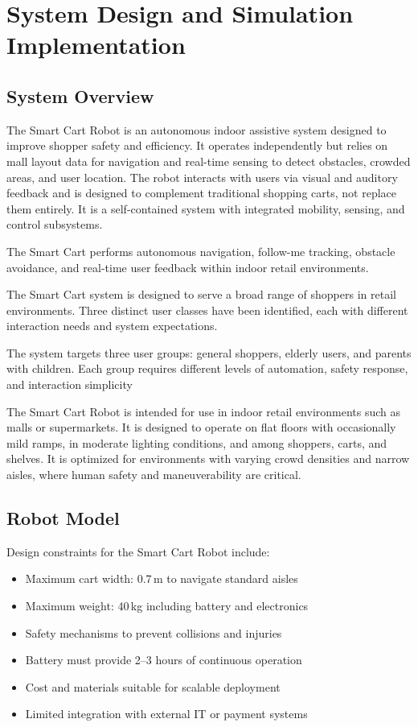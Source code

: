 \section{System Design and Simulation Implementation}

\subsection{System Overview}

The Smart Cart Robot is an autonomous indoor assistive system designed
to improve shopper safety and efficiency. It operates independently but
relies on mall layout data for navigation and real-time sensing to detect
obstacles, crowded areas, and user location. The robot interacts with
users via visual and auditory feedback and is designed to complement
traditional shopping carts, not replace them entirely. It is a
self-contained system with integrated mobility, sensing, and control
subsystems.

The Smart Cart performs autonomous navigation, follow-me tracking, obstacle avoidance, and real-time user feedback within indoor retail environments.

The Smart Cart system is designed to serve a broad range of shoppers in
retail environments. Three distinct user classes have been identified,
each with different interaction needs and system expectations.

The system targets three user groups: general shoppers, elderly users, and parents with children. Each group requires different levels of automation, safety response, and interaction simplicity

The Smart Cart Robot is intended for use in indoor retail environments
such as malls or supermarkets. It is designed to operate on flat floors
with occasionally mild ramps, in moderate lighting conditions, and among
shoppers, carts, and shelves. It is optimized for environments with
varying crowd densities and narrow aisles, where human safety and
maneuverability are critical.

\subsection{Robot Model}

Design constraints for the Smart Cart Robot include:
\begin{itemize}
  \item Maximum cart width: 0.7\,m to navigate standard aisles
  \item Maximum weight: 40\,kg including battery and electronics
  \item Safety mechanisms to prevent collisions and injuries
  \item Battery must provide 2--3 hours of continuous operation
  \item Cost and materials suitable for scalable deployment
  \item Limited integration with external IT or payment systems
\end{itemize}

